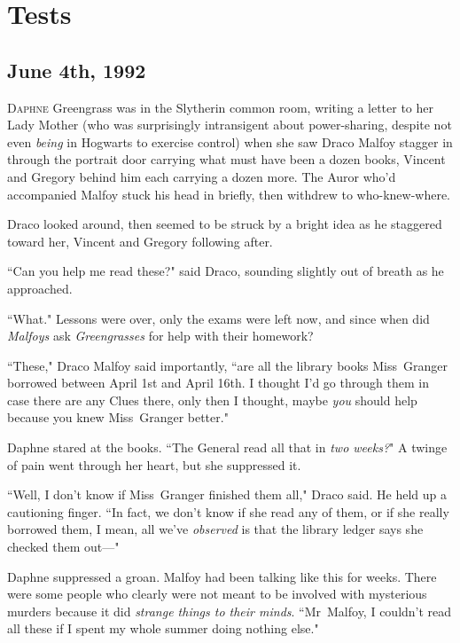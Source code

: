 \chapter{Tests}

\section{June 4th, 1992}

\lettrine{D}{aphne} Greengrass was in the Slytherin common room, writing a letter to her Lady Mother (who was surprisingly intransigent about power-sharing, despite not even \emph{being} in Hogwarts to exercise control) when she saw Draco Malfoy stagger in through the portrait door carrying what must have been a dozen books, Vincent and Gregory behind him each carrying a dozen more. The Auror who'd accompanied Malfoy stuck his head in briefly, then withdrew to who-knew-where.

Draco looked around, then seemed to be struck by a bright idea as he staggered toward her, Vincent and Gregory following after.

``Can you help me read these?" said Draco, sounding slightly out of breath as he approached.

``What." Lessons were over, only the exams were left now, and since when did \emph{Malfoys} ask \emph{Greengrasses} for help with their homework?

``These," Draco Malfoy said importantly, ``are all the library books Miss~Granger borrowed between April 1st and April 16th. I thought I'd go through them in case there are any Clues there, only then I thought, maybe \emph{you} should help because you knew Miss~Granger better."

Daphne stared at the books. ``The General read all that in \emph{two weeks?}" A twinge of pain went through her heart, but she suppressed it.

``Well, I don't know if Miss~Granger finished them all," Draco said. He held up a cautioning finger. ``In fact, we don't know if she read any of them, or if she really borrowed them, I mean, all we've \emph{observed} is that the library ledger says she checked them out—"

Daphne suppressed a groan. Malfoy had been talking like this for weeks. There were some people who clearly were not meant to be involved with mysterious murders because it did \emph{strange things to their minds}. ``Mr~Malfoy, I couldn't read all these if I spent my whole summer doing nothing else."

